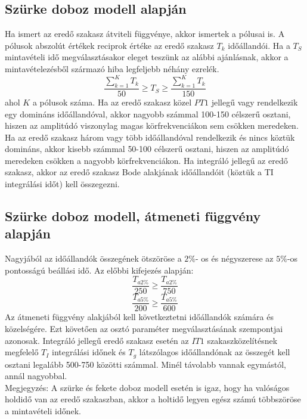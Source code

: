 \documentclass[11pt,a4paper]{article}
\begin{document}
\subsection{Szürke doboz modell alapján}
Ha ismert az eredő szakasz átviteli függvénye, akkor ismertek a pólusai is. A
pólusok abszolút értékek reciprok értéke az eredő szakasz $T_k$ időállandói. Ha a $T_S$ mintavételi
idő megválasztásakor eleget teszünk az alábbi ajánlásnak, akkor a mintavételezésből
származó hiba legfeljebb néhány ezrelék.
$$\frac{\sum_{k=1}^{K}{T_k}}{50} \geq T_S \geq \frac{\sum_{k=1}^{K}{T_k}}{150}$$ahol $K$ a pólusok száma.
Ha az eredő szakasz közel $PT1$ jellegű vagy rendelkezik egy domináns időállandóval, akkor nagyobb számmal {100-150} célszerű osztani, hiszen az amplitúdó viszonylag magas körfrekvenciákon sem csökken meredeken.
Ha az eredő szakasz három vagy több időállandóval rendelkezik és nincs köztük
domináns, akkor kisebb számmal {50-100} célszerű osztani, hiszen az amplitúdó
meredeken csökken a nagyobb körfrekvenciákon.
Ha integráló jellegű az eredő szakasz, akkor az eredő szakasz Bode alakjának
időállandóit (köztük a TI integrálási időt) kell összegezni.
\subsection{Szürke doboz modell, átmeneti függvény alapján}
Nagyjából az időállandók összegének ötszöröse a $2\%$-
os és négyszerese az $5\%$-os pontosságú beállási idő. Az előbbi kifejezés alapján:$$\frac{T_{a2\%}}{250} \geq \frac{T_{a2\%}}{750}$$
$$\frac{T_{a5\%}}{200} \geq \frac{T_{a5\%}}{600}$$
Az átmeneti függvény alakjából kell következtetni időállandók számára és közelségére.
Ezt követően az osztó paraméter megválasztásának szempontjai azonosak.
Integráló jellegű eredő szakasz esetén az $IT1$ szakaszközelítésnek megfelelő $T_I$
integrálási időnek és $T_g$ látszólagos időállandónak az összegét kell osztani legalább
{500-750} közötti számmal. Minél távolabb vannak egymástól, annál nagyobbal.\\
Megjegyzés: A szürke és fekete doboz modell esetén is igaz, hogy ha valóságos
holdidő van az eredő szakaszban, akkor a holtidő legyen egész számú többszöröse a
mintavételi időnek.
\end{document}

